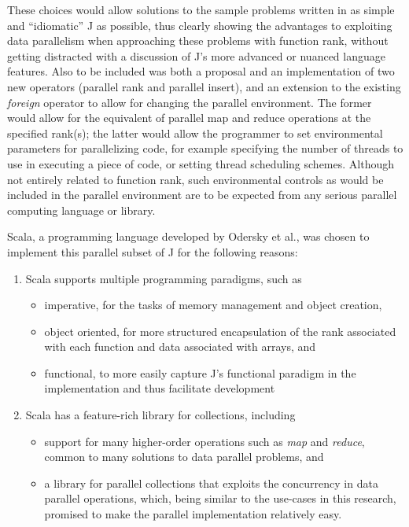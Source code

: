 These choices would allow solutions to the sample problems written in as simple and ``idiomatic'' J as possible, 
thus clearly showing the advantages to exploiting data parallelism when approaching these problems with function rank, 
without getting distracted with a discussion of J's more advanced or nuanced language features. 
Also to be included was both a proposal and an implementation of two new operators (parallel rank and parallel insert), 
and an extension to the existing \textit{foreign} operator to allow for changing the parallel environment. 
The former would allow for the equivalent of parallel map and reduce operations at the specified rank(s); 
the latter would allow the programmer to set environmental parameters for parallelizing code, 
for example specifying the number of threads to use in executing a piece of code, or setting thread scheduling schemes.
Although not entirely related to function rank, such environmental controls as would be included in the parallel environment 
are to be expected from any serious parallel computing language or library.

Scala, a programming language developed by Odersky et al.\cite{scala}, 
was chosen to implement this parallel subset of J for the following reasons:
\begin{enumerate} 
	\item Scala supports multiple programming paradigms, such as
	\begin{itemize}
		\item imperative, for the tasks of memory management and object creation,
		\item object oriented, for more structured encapsulation of the rank associated with each function 
			and data associated with arrays, and
		\item functional, to more easily capture J's functional paradigm in the implementation and thus facilitate development
	\end{itemize}
	\item Scala has a feature-rich library for collections, including 
	\begin{itemize}
		\item support for many higher-order operations such as \textit{map} and \textit{reduce}, 
			common to many solutions to data parallel problems\cite{scala28col}, and
		\item a library for parallel collections that exploits the concurrency in data parallel operations\cite{pc},
			which, being similar to the use-cases in this research, promised to make the parallel implementation relatively easy.
	\end{itemize}
\end{enumerate}


